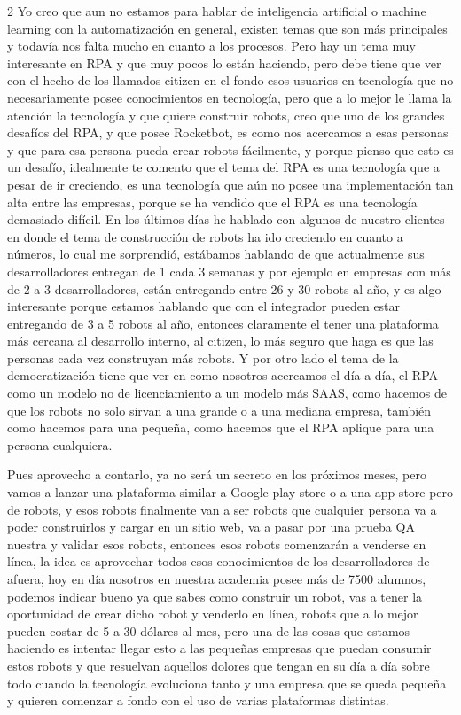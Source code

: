 \documentclass[12pt,spanish,Letterpaper,openany]{book}
\begin{document}
\begin {multicols}{2}
Yo creo que aun no estamos para hablar de inteligencia artificial o machine learning con la automatización en general, existen temas que son más principales y todavía nos falta mucho en cuanto a los procesos. Pero hay un tema muy interesante en RPA y que muy pocos lo están haciendo, pero debe tiene que ver con el hecho de los llamados citizen en el fondo esos usuarios en tecnología que no necesariamente posee conocimientos en tecnología, pero que a lo mejor le llama la atención la tecnología y que quiere construir robots, creo que uno de los grandes desafíos del RPA, y que posee Rocketbot, es como nos acercamos a esas personas y que para esa persona pueda crear robots fácilmente, y porque pienso que esto es un desafío, idealmente te comento que el tema del RPA es una tecnología que a pesar de ir creciendo, es una tecnología que aún no posee una implementación tan alta entre las empresas, porque se ha vendido que el RPA es una tecnología demasiado difícil. En los últimos días he hablado con algunos de nuestro clientes en donde el tema de construcción de robots ha ido creciendo en cuanto a números, lo cual me sorprendió, estábamos hablando de que actualmente sus desarrolladores entregan de 1 cada 3 semanas y por ejemplo en empresas con más de 2 a 3 desarrolladores, están entregando entre 26 y 30 robots al año, y es algo interesante porque estamos hablando que con el integrador pueden estar entregando de 3 a 5 robots al año, entonces claramente el tener una plataforma más cercana al desarrollo interno, al citizen, lo más seguro que haga es que las personas cada vez construyan más robots. Y por otro lado el tema de la democratización tiene que ver en como nosotros acercamos el día a día, el RPA como un modelo no de licenciamiento a un modelo más SAAS, como hacemos de que los robots no solo sirvan a una grande o a una mediana empresa, también como hacemos para una pequeña, como hacemos que el RPA aplique para una persona cualquiera.

Pues aprovecho a contarlo, ya no será un secreto en los próximos meses, pero vamos a lanzar una plataforma similar a Google play store o a una app store pero de robots, y esos robots finalmente van a ser robots que cualquier persona va a poder construirlos y cargar en un sitio web, va a pasar por una prueba QA nuestra y validar esos robots, entonces esos robots comenzarán a venderse en línea, la idea es aprovechar todos esos conocimientos de los desarrolladores de afuera, hoy en día nosotros en nuestra academia posee más de 7500 alumnos, podemos indicar bueno ya que sabes como construir un robot, vas a tener la oportunidad de crear dicho robot y venderlo en línea, robots que a lo mejor pueden costar de 5 a 30 dólares al mes, pero una de las cosas que estamos haciendo es intentar llegar esto a las pequeñas empresas que puedan consumir estos robots y que resuelvan aquellos dolores que tengan en su día a día sobre todo cuando la tecnología evoluciona tanto y una empresa que se queda pequeña y quieren comenzar a fondo con el uso de varias plataformas distintas.


\end{multicols}
\end{document}
